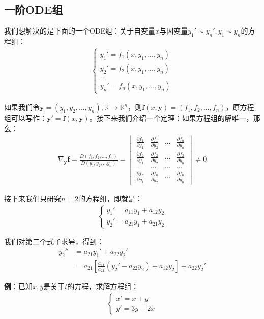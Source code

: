\documentclass{ctexart}
\let\oldtextbf\textbf
\renewcommand{\textbf}[1]{\textcolor{brown!50!red}{\oldtextbf{#1}}}
\begin{document}
\subsection{一阶ODE组}
我们想解决的是下面的一个ODE组：关于自变量$x$与因变量$y_1'\sim y_n',y_1\sim y_n$的方程组：
\begin{align*}
\begin{cases}
y_1'=f_1(x,y_1,...,y_n)\\
y_2'=f_2(x,y_1,...,y_n)\\
...\\
y_n'=f_n(x,y_1,...,y_n)
\end{cases}
\end{align*}

如果我们令$\bm{y}=(y_1,y_2,...,y_n),\mathbb{R}\to\mathbb{R}^n$，则$\bm{f}(x,\bm{y})=(f_1,f_2,...,f_n)$，原方程组可以写作：$\bm{y'}=\bm{f}(x,\bm{y})$。接下来我们介绍一个定理：如果方程组的解唯一，那么：
\begin{align*}
\nabla_{\bm{y}}\bm{f}=\frac{D(f_1,f_2,...,f_n)}{D(y_1,y_2,...y_n)}
=\begin{vmatrix}
 \frac{\partial f_1}{\partial y_1} & \frac{\partial f_1}{\partial y_2} & ... &\frac{\partial f_n}{\partial y_n} \\
 \frac{\partial f_2}{\partial y_1} & \frac{\partial f_2}{\partial y_2} & ... & \frac{\partial f_2}{\partial y_n}\\
 ... & ... & ... & ...\\
 \frac{\partial f_n}{\partial y_1} & \frac{\partial f_n}{\partial y_2} & ... &\frac{\partial f_n}{\partial y_n}
\end{vmatrix}\neq 0\tag{4-24} 
\end{align*}

接下来我们只研究$n=2$的方程组，即就是：
\begin{align*}
\begin{cases}
y_1'=a_{11}y_1+a_{12}y_2\\
y_2'=a_{21}{y_1}+a_{21}y_2
\end{cases}
\end{align*}

我们对第二个式子求导，得到：
\begin{align*}
y_2''&=a_{21}y_1'+a_{22}y_2'\\
&=a_{21}\left[\frac{a_{11}}{a_{21}}(y_2'-a_{22}y_2)+a_{12}y_2\right]+a_{22}y_2'
\end{align*}

\textbf{\color{brown!50!red}例}：已知$x,y$是关于$t$的方程，求解方程组：
\begin{align*}
\begin{cases}
x'=x+y\\
y'=3y-2x
\end{cases}
\end{align*}
\end{document}

